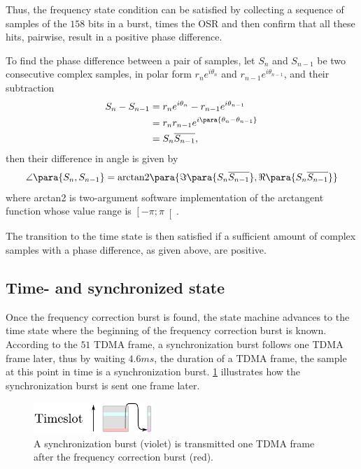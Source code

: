 Thus, the frequency state condition can be satisfied by collecting a
sequence of samples of the $158$ bits in a burst, times the \gls{OSR}
and then confirm that all these hits, pairwise, result in a positive
phase difference.

To find the phase difference between a pair of samples, let $S_n$ and
$S_{n-1}$ be two consecutive complex samples, in polar form
$r_ne^{i\theta_{n}}$ and $r_{n-1}e^{i\theta_{n-1}}$, and their
subtraction
\begin{equation}
  \begin{aligned}
    S_n - S_{n - 1}
    &= r_ne^{i \theta_n} - r_{n - 1}e^{{i \theta_{n - 1}}}\\
    &= r_nr_{n - 1}e^{i \para{\theta_n - \theta_{n-1}}}\\
    &= S_n \overline{S_{n - 1}},
  \end{aligned}
\end{equation}
then their difference in angle is given by
\begin{equation}
  \begin{aligned}
    \angle \para{S_n, S_{n - 1}}
    = \text{arctan2} \para{\Im \para{S_n \overline{S_{n - 1}}},
                           \Re \para{S_n \overline{S_{n - 1}}}}
  \end{aligned}
\end{equation}
where arctan2 is two-argument software implementation of the
arctangent function whose value range is $\left[-\pi;\pi\right[$.

The transition to the time state is then satisfied if a sufficient
amount of complex samples with a phase difference, as given above, are
positive.

\subsection{Time- and synchronized state}
Once the frequency correction burst is found, the state machine
advances to the time state where the beginning of the frequency
correction burst is known. According to the $51$ \gls{TDMA} frame, a
synchronization burst follows one \gls{TDMA} frame later, thus by
waiting $4.6\si{ms}$, the duration of a \gls{TDMA} frame, the sample
at this point in time is a synchronization
burst. \cref{fig:sch_time_wait} illustrates how the synchronization
burst is sent one frame later.

\begin{figure}[H]
  \centering
  \includegraphics[width=0.4\textwidth]{figures/sch_time_wait}
  \caption{A synchronization burst (violet) is transmitted one
    TDMA frame after the frequency correction burst (red).}
  \label{fig:sch_time_wait}
\end{figure}

